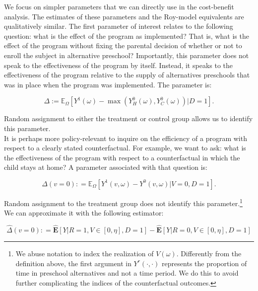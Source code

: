 \noindent We focus on simpler parameters that we can directly use in the cost-benefit analysis. The estimates of these parameters and the Roy-model equivalents are qualitatively similar. The first parameter of interest relates to the following question: what is the effect of the program as implemented? That is, what is the effect of the program without fixing the parental decision of whether or not to enroll the subject in alternative preschool? Importantly, this parameter does not speak to the effectiveness of the program by itself. Instead, it speaks to the effectiveness of the program relative to the supply of alternatives preschools that was in place when the program was implemented. The parameter is: 

\begin{equation}
\Delta := \mathbb{E}_{\Omega} \left[ Y^1 \left( \omega \right) -  \max \left(  Y_{H}^0 \left( \omega \right) ,  Y_{C}^0 \left( \omega \right)  \right) | D =1 \right]. \label{eq:mainest}
\end{equation}

\noindent Random assignment to either the treatment or control group allows us to identify this parameter.\\ 

\noindent It is perhaps more policy-relevant to inquire on the efficiency of a program with respect to a clearly stated counterfactual. For example, we want to ask: what is the effectiveness of the program with respect to a counterfactual in which the child stays at home? A parameter associated with that question is: 

\begin{equation}
\Delta \left( v = 0 \right) : =   \mathbb{E}_{\Omega} \left[ Y^1 \left( v, \omega \right) - Y^0 \left( v, \omega \right) | V = 0, D = 1 \right]. \label{eq:par0}
\end{equation}

\noindent Random assignment to the treatment group does not identify this parameter.\footnote{We abuse notation to index the realization of $V \left( \omega \right)$. Differently from the definition above, the first argument in $Y^r \left( \cdot, \cdot \right)$ represents the proportion of time in preschool alternatives and not a time period. We do this to avoid further complicating the indices of the counterfactual outcomes.} We can approximate it with the following estimator: 

\begin{equation}
\widehat{\Delta} \left( v = 0 \right) : = \widehat{\mathbf{E}} \left[ Y | R = 1, V \in \left[ 0 , \eta \right], D = 1 \right] - \widehat{\mathbf{E}} \left[ Y | R = 0, V \in \left[ 0 , \eta \right], D = 1 \right] \label{eq:estimates0}
\end{equation}

